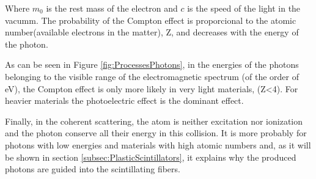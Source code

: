 Where $m_0$ is the rest mass of the electron and $c$ is the speed of the light in the vacumm. The probability of the Compton effect is proporcional to the atomic number(available electrons in the matter), Z,  and decreases with the energy of the photon. 

As can be seen in Figure \ref{fig:ProcessesPhotons}, in the energies of the photons belonging to the visible range of the electromagnetic spectrum (of the order of eV), the Compton effect is only more likely in very light materials, (Z<4). For heavier materials the photoelectric effect is the dominant effect.

Finally, in the coherent scattering, the atom is neither excitation nor ionization and the photon conserve all their energy in this collision. It is more probably for photons with low energies and materials with high atomic numbers and, as it will be shown in section \ref{subsec:PlasticScintillators}, it explains why the produced photons are guided into the scintillating fibers. 


